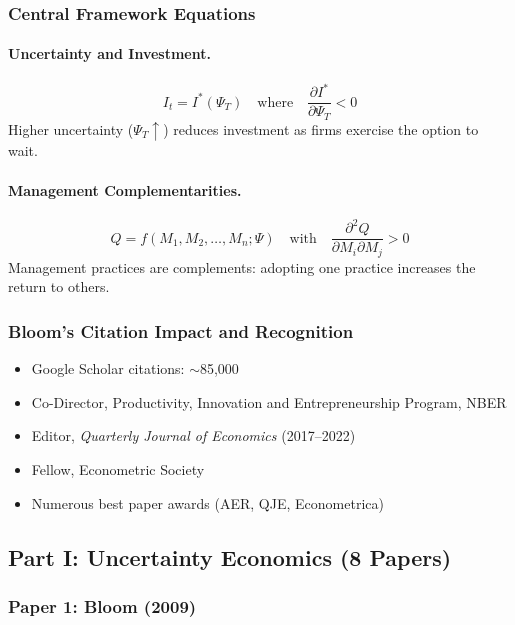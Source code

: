 \documentclass[12pt,a4paper]{article}
\begin{document}
\subsubsection{Central Framework Equations}

\paragraph{Uncertainty and Investment.}
\begin{equation}
  I_t = I^*(\Psi_T) \quad \text{where} \quad \frac{\partial I^*}{\partial \Psi_T} < 0
\end{equation}
Higher uncertainty ($\Psi_T \uparrow$) reduces investment as firms exercise the option to wait.

\paragraph{Management Complementarities.}
\begin{equation}
  Q = f(M_1, M_2, \ldots, M_n; \Psi) \quad \text{with} \quad \frac{\partial^2 Q}{\partial M_i \partial M_j} > 0
\end{equation}
Management practices are complements: adopting one practice increases the return to others.

\subsubsection{Bloom's Citation Impact and Recognition}

\begin{itemize}
  \item Google Scholar citations: $\sim$85,000
  \item Co-Director, Productivity, Innovation and Entrepreneurship Program, NBER
  \item Editor, \textit{Quarterly Journal of Economics} (2017--2022)
  \item Fellow, Econometric Society
  \item Numerous best paper awards (AER, QJE, Econometrica)
\end{itemize}

\subsection{Part I: Uncertainty Economics (8 Papers)}

\subsubsection{Paper 1: Bloom (2009)}
\end{document}
